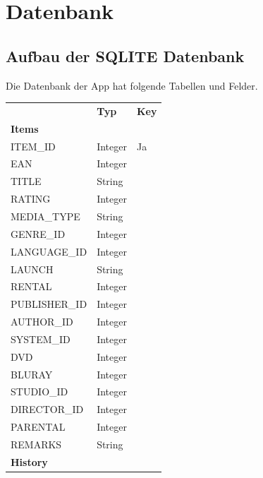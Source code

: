 \section{Datenbank}

\subsection{Aufbau der SQLITE Datenbank}

Die Datenbank der App hat folgende Tabellen und Felder.

\begin{table} [htbp]
	\begin{center}
		\begin{tabular}{|l|l|l|}
			\rowcolor{black} {\color{white}\textbf{}} & {\color{white}\textbf{Typ}} & {\color{white}\textbf{Key}} \\
			\textbf{Items} & &  \\ \hline
			\rowcolor{DarkSeaGreen} ITEM\_ID & Integer & Ja \\ \hline
			EAN & Integer & \\ \hline
			\rowcolor{DarkSeaGreen} TITLE & String & \\ \hline	
			RATING & Integer & \\ \hline
			\rowcolor{DarkSeaGreen} MEDIA\_TYPE & String & \\ \hline
			GENRE\_ID & Integer & \\ \hline
			\rowcolor{DarkSeaGreen} LANGUAGE\_ID & Integer & \\ \hline
			LAUNCH & String \\ \hline
			\rowcolor{DarkSeaGreen} RENTAL & Integer & \\ \hline
			PUBLISHER\_ID & Integer & \\ \hline
			\rowcolor{DarkSeaGreen} AUTHOR\_ID & Integer & \\ \hline
			SYSTEM\_ID & Integer & \\ \hline
			\rowcolor{DarkSeaGreen} DVD & Integer & \\ \hline
			BLURAY & Integer & \\ \hline
			\rowcolor{DarkSeaGreen} STUDIO\_ID & Integer & \\ \hline
			DIRECTOR\_ID & Integer & \\ \hline
			\rowcolor{DarkSeaGreen} PARENTAL & Integer & \\ \hline
			REMARKS & String & \\ \hline
			\rowcolor{DarkSeaGreen} \textbf{History} & & \\ \hline

\end{tabular}
\end{center}
\end{table}
